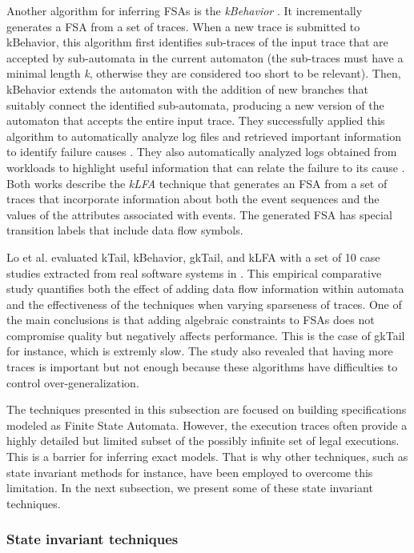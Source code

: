 Another algorithm for inferring FSAs is the \textit{kBehavior}
\cite{mariani2007dynamic}. It incrementally generates a FSA from
a set of traces. When a new trace is submitted to kBehavior, this
algorithm first identifies sub-traces of the input trace that are
accepted by sub-automata in the current automaton (the sub-traces
must have a minimal length \textit{k}, otherwise they are
considered too short to be relevant). Then, kBehavior extends the
automaton with the addition of new branches that suitably connect
the identified sub-automata, producing a new version of the
automaton that accepts the entire input trace. They successfully
applied this algorithm to automatically analyze log files and
retrieved important information to identify failure causes
\cite{4700316}. They also automatically analyzed logs obtained
from workloads to highlight useful information that can relate
the failure to its cause \cite{cotroneo2007investigation}.  Both
works describe the \textit{kLFA} technique that generates an FSA
from a set of traces that incorporate information about both the
event sequences and the values of the attributes associated with
events. The generated FSA has special transition labels that
include data flow symbols.

Lo et al. evaluated kTail, kBehavior, gkTail, and kLFA with a set
of 10 case studies extracted from real software systems in
\cite{Lo20122063}. This empirical comparative study quantifies
both the effect of adding data flow information within automata
and the effectiveness of the techniques when varying sparseness
of traces. One of the main conclusions is that adding algebraic
constraints to FSAs does not compromise quality but negatively
affects performance. This is the case of gkTail for instance,
which is extremly slow. The study also revealed that having more
traces is important but not enough because these algorithms have
difficulties to control over-generalization.

The techniques presented in this subsection are focused on building
specifications modeled as Finite State Automata. However, the
execution traces often provide a highly detailed but limited
subset of the possibly infinite set of legal executions. This is
a barrier for inferring exact models.
That is why other techniques, such as state invariant methods for
instance, have been employed to overcome this limitation. In the
next subsection, we present some of these state invariant
techniques.


\subsubsection{State invariant techniques}
\label{sec:passive-spec}

